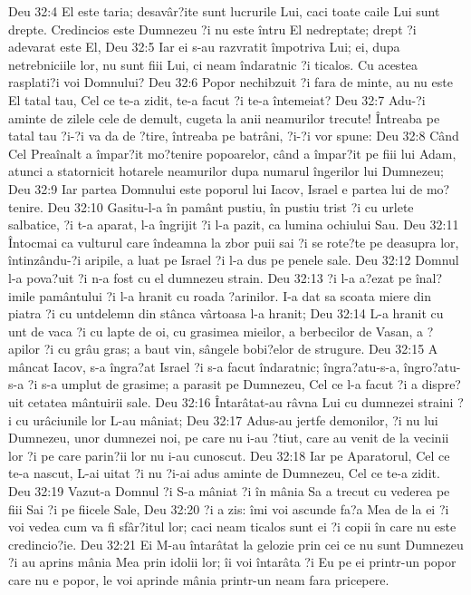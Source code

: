 Deu 32:4  El este taria; desavâr?ite sunt lucrurile Lui, caci toate caile Lui sunt drepte. Credincios este Dumnezeu ?i nu este întru El nedreptate; drept ?i adevarat este El,
Deu 32:5  Iar ei s-au razvratit împotriva Lui; ei, dupa netrebniciile lor, nu sunt fiii Lui, ci neam îndaratnic ?i ticalos. Cu acestea rasplati?i voi Domnului?
Deu 32:6  Popor nechibzuit ?i fara de minte, au nu este El tatal tau, Cel ce te-a zidit, te-a facut ?i te-a întemeiat?
Deu 32:7  Adu-?i aminte de zilele cele de demult, cugeta la anii neamurilor trecute! Întreaba pe tatal tau ?i-?i va da de ?tire, întreaba pe batrâni, ?i-?i vor spune:
Deu 32:8  Când Cel Preaînalt a împar?it mo?tenire popoarelor, când a împar?it pe fiii lui Adam, atunci a statornicit hotarele neamurilor dupa numarul îngerilor lui Dumnezeu;
Deu 32:9  Iar partea Domnului este poporul lui Iacov, Israel e partea lui de mo?tenire.
Deu 32:10  Gasitu-l-a în pamânt pustiu, în pustiu trist ?i cu urlete salbatice, ?i t-a aparat, l-a îngrijit ?i l-a pazit, ca lumina ochiului Sau.
Deu 32:11  Întocmai ca vulturul care îndeamna la zbor puii sai ?i se rote?te pe deasupra lor, întinzându-?i aripile, a luat pe Israel ?i l-a dus pe penele sale.
Deu 32:12  Domnul l-a pova?uit ?i n-a fost cu el dumnezeu strain.
Deu 32:13  ?i l-a a?ezat pe înal?imile pamântului ?i l-a hranit cu roada ?arinilor. I-a dat sa scoata miere din piatra ?i cu untdelemn din stânca vârtoasa l-a hranit;
Deu 32:14  L-a hranit cu unt de vaca ?i cu lapte de oi, cu grasimea mieilor, a berbecilor de Vasan, a ?apilor ?i cu grâu gras; a baut vin, sângele bobi?elor de strugure.
Deu 32:15  A mâncat Iacov, s-a îngra?at Israel ?i s-a facut îndaratnic; îngra?atu-s-a, îngro?atu-s-a ?i s-a umplut de grasime; a parasit pe Dumnezeu, Cel ce l-a facut ?i a dispre?uit cetatea mântuirii sale.
Deu 32:16  Întarâtat-au râvna Lui cu dumnezei straini ?i cu urâciunile lor L-au mâniat;
Deu 32:17  Adus-au jertfe demonilor, ?i nu lui Dumnezeu, unor dumnezei noi, pe care nu i-au ?tiut, care au venit de la vecinii lor ?i pe care parin?ii lor nu i-au cunoscut.
Deu 32:18  Iar pe Aparatorul, Cel ce te-a nascut, L-ai uitat ?i nu ?i-ai adus aminte de Dumnezeu, Cel ce te-a zidit.
Deu 32:19  Vazut-a Domnul ?i S-a mâniat ?i în mânia Sa a trecut cu vederea pe fiii Sai ?i pe fiicele Sale,
Deu 32:20  ?i a zis: îmi voi ascunde fa?a Mea de la ei ?i voi vedea cum va fi sfâr?itul lor; caci neam ticalos sunt ei ?i copii în care nu este credincio?ie.
Deu 32:21  Ei M-au întarâtat la gelozie prin cei ce nu sunt Dumnezeu ?i au aprins mânia Mea prin idolii lor; îi voi întarâta ?i Eu pe ei printr-un popor care nu e popor, le voi aprinde mânia printr-un neam fara pricepere.
